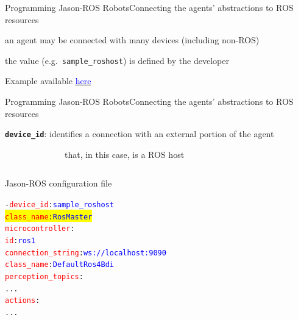 \documentclass[compress]{beamer}
\newcommand{\yamlkey}[1]{\textcolor{red}{\texttt{#1}}}
\newcommand{\yamlvalue}[1]{\textcolor{blue}{\texttt{#1}}}
\newcommand{\link}[2]{\href{#1}{\underline{\textcolor{blue}{#2}}}}
\begin{document}
\begin{frame}[fragile]{Programming Jason-ROS Robots}{Connecting the agents' abstractions to ROS resources}
  
    \vspace{.3cm}
  
    an agent may be connected with many devices {\tiny (including non-ROS)}\\ \vspace{-.2cm}
  
    the value (e.g.~\texttt{sample\_roshost}) is defined by the developer
    
    \vfill
    {\tiny Example available \link{https://github.com/issia-2026-jason-ros/turtle-example/blob/master/src/agt/robot1.yaml}{here}}
    
\end{frame}



\begin{frame}[fragile]{Programming Jason-ROS Robots}{Connecting the agents' abstractions to ROS resources}

    \footnotesize
    \texttt{{\bf device\_id}}: identifies a connection with an external portion of the agent\\ 
    
    \vspace{-.5cm}
    
    \ \ \ \ \ \ \ \ \ \ \ \ \ \ {\tiny that, in this case, is a ROS host}

    
    \begin{columns}
       \begin{column}{.42\textwidth}      
            \begin{block}{{\scriptsize Jason-ROS configuration file}}
                \scriptsize
                \begin{alltt} \tiny
- \yamlkey{device\_id}: \yamlvalue{sample\_roshost}
 \colorbox{yellow}{\yamlkey{class_name}: \yamlvalue{RosMaster}}
  \yamlkey{microcontroller}: 
    \yamlkey{id}: \yamlvalue{ros1} 
    \yamlkey{connection_string}: \yamlvalue{ws://localhost:9090} 
    \yamlkey{class_name}: \yamlvalue{DefaultRos4Bdi}
  \yamlkey{perception_topics}:         
    ...
  \yamlkey{actions}:       
    ...
                \end{alltt}

            \end{block}    
        \end{column}
        
        \hspace{-25pt} %
  
        \begin{column}{.55\textwidth} \scriptsize
  

\end{column}
\end{columns}
\end{frame}
\end{document}
